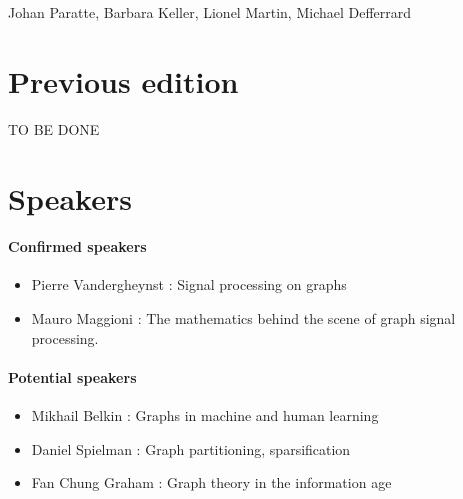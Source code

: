 \documentclass[a4paper]{scrartcl}
\newcommand{\nati}[1]{{\textcolor[rgb]{.1,.6,.1}{#1}}}
\begin{document}
\vspace{0.5cm}

Johan Paratte, Barbara Keller, Lionel Martin, Michael Defferrard









\newpage

\section{Previous edition}
\nati{TO BE DONE}

\section{Speakers}

\paragraph{Confirmed speakers}
\begin{itemize}
	\item Pierre Vandergheynst : Signal processing on graphs
	\item Mauro Maggioni : The mathematics behind the scene of graph signal processing.
\end{itemize}

\paragraph{Potential speakers}
\begin{itemize}
	\item Mikhail Belkin : Graphs in machine and human learning
	\item Daniel Spielman : Graph partitioning, sparsification
	\item Fan Chung Graham : Graph theory in the information age
\end{itemize}
\end{document}

